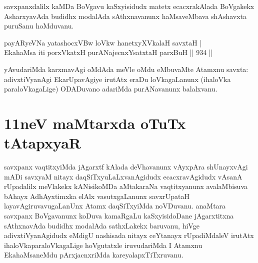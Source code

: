 \begin{artha}
savxpanxdalilx kaMDa BoVgavu kaSxyisidudx matetx ecacxrakAlada BoVgakekx AsharxyavAda budidhx modalAda sAthxnavanunx haMsaveMbava shAshavxta puruSanu hoMduvanu.
\end{artha}


\begin{shl}
payARyeVNa yatashocxVBw loVkw hanetxyXVkalaH savxtaH | \\
EkahaMsa iti porxVkatxH \footnotemark[1]purANajecnxYsatxtaH parxBuH \hfill||  934 ||  
\end{shl}

\begin{artha}
yAvudariMda karxmavAgi oMdAda meVle oMdu eMbuvaMte Atamxnu savxta: adivxtiVyanAgi EkarUpavAgiye irutAtx eraDu loVkagaLanunx (ihaloVka paraloVkagaLige) ODADuvano adariMda purANavanunx balalxvanu.
\end{artha}


\section*{11neV maMtarxda oTuTx tAtapxyaR}

\begin{artha}
savxpanx vaqtitxyiMda jAgarxtf kAlada deVhavanunx vAyxpAra shUnayxvAgi mADi savxyaM nitayx daqSiTxyuLaLxvanAgidudx ecacxravAgidudx vAsanA rUpadalilx meVlakekx kANisikoMDa aMtakaraNa vaqtitxyanunx avalaMbisuva bAhayx AdhAyxtimxka elAlx vasutxgaLanunx savxrUpataH layavAgiruvavugaLanUnx Atamx daqSiTxyiMda noVDuvanu. anaMtara savxpanx BoVgavanunx koDuva kamaRgaLu kaSxyisidoDane jAgarxtitxna sAthxnavAda budidhx modalAda sathxLakekx baruvanu, hiVge adivxtiVyanAgidudx eMdigU nashisada nitayx ceYtanayx rUpadiMdaleV irutAtx ihaloVkaparaloVkagaLige hoVgutatxle iruvudariMda I Atamxnu EkahaMsaneMdu pArxjacnxriMda kareyalapxTiTxruvanu.
\end{artha}

